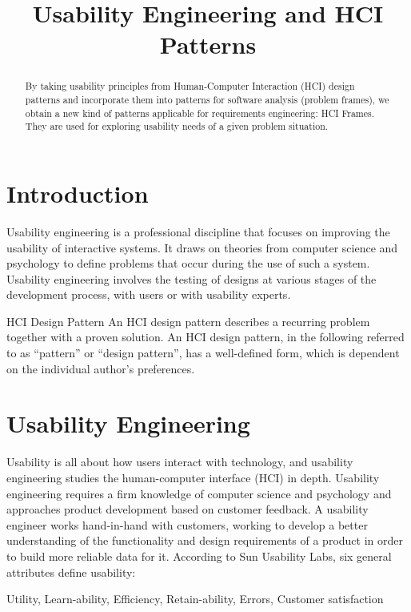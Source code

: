 \documentclass[letterpaper,12pt]{article}
\begin{document}
\title{Usability Engineering and HCI Patterns}
\maketitle

\begin{abstract}
By taking usability principles from Human-Computer Interaction (HCI) design patterns and incorporate them into patterns for software analysis (problem frames), we obtain a new kind of patterns applicable for requirements engineering: HCI Frames. They are used for exploring usability needs of a given problem situation.
\end{abstract}


\section{Introduction}

Usability engineering is a professional discipline that focuses on improving the usability of interactive systems. It draws on theories from computer science and psychology to define problems that occur during the use of such a system. Usability engineering involves the testing of designs at various stages of the development process, with users or with usability experts.

HCI Design Pattern An HCI design pattern describes a recurring problem together with a proven solution. An HCI design pattern, in the following referred to as “pattern” or “design pattern”, has a well-defined form, which is dependent on the individual author's preferences.

\section{Usability Engineering}

Usability is all about how users interact with technology, and usability engineering studies the human-computer interface (HCI) in depth. Usability engineering requires a firm knowledge of computer science and psychology and approaches product development based on customer feedback. A usability engineer works hand-in-hand with customers, working to develop a better understanding of the functionality and design requirements of a product in order to build more reliable data for it. According to Sun Usability Labs, six general attributes define usability:

Utility,
Learn-ability,
Efficiency,
Retain-ability,
Errors,
Customer satisfaction
\end{document}
